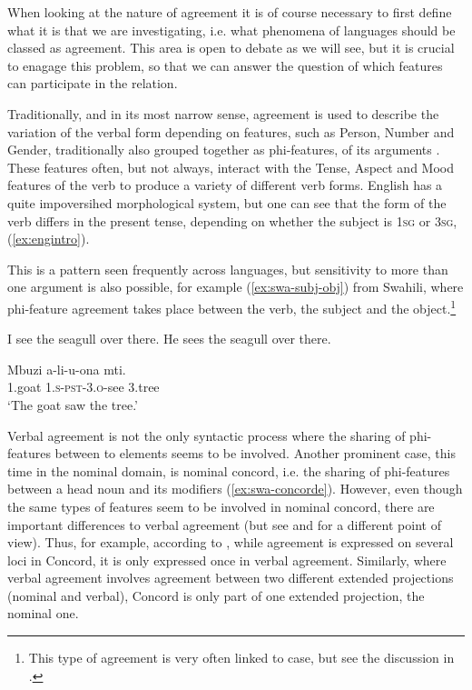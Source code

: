 \documentclass[output=paper
,modfonts
,nonflat]{langsci/langscibook}
\begin{document}
When looking at the nature of agreement it is of course necessary to first define what it is that we are investigating, i.e. what phenomena of languages should be classed as agreement. This area is open to debate as we will see, but it is crucial to enagage this problem, so that we can answer the question of which features can participate in the {\agr} relation.

Traditionally, and in its most narrow sense, agreement is used to describe the variation of the verbal form depending on features, such as Person, Number and Gender, traditionally also grouped together as phi-fea\-tures, of its arguments \citep{preminger2015}.
These features often, but not always, interact with the Tense, Aspect and Mood features of the verb to produce a variety of different verb forms.
English has a quite impoversihed morphological system, but one can see that the form of the verb differs in the present tense, depending on whether the subject is \textsc{1sg} or \textsc{3sg}, (\ref{ex:engintro}).

This is a pattern seen frequently across languages, but sensitivity to more than one argument is also possible, for example (\ref{ex:swa-subj-obj}) from Swahili, where phi-feature agreement takes place between the verb, the subject and the object.\footnote{This type of agreement is very often linked to case, but see the discussion in .}

\begin{exe}
	\ex \label{ex:engintro}
	\begin{xlist}
		\ex I see the seagull over there.
		\ex He sees the seagull over there.
	\end{xlist}
\end{exe}

\begin{exe}
	\ex \label{ex:swa-subj-obj}
	\gll Mbuzi a-li-u-ona mti.\\
	1.goat \textsc{1.s-pst-3.o}-see 3.tree\\
	\glt `The goat saw the tree.'

\end{exe}
Verbal agreement is not the only syntactic process where the sharing of phi-fea\-tures between to elements seems to be involved.
Another prominent case, this time in the nominal domain, is nominal concord, i.e. the sharing of phi-fea\-tures between a head noun and its modifiers (\ref{ex:swa-concorde}).
However, even though the same types of features seem to be involved in nominal concord, there are important differences to verbal agreement (but see \citealt{Carstens2001} and \citealt{Baker2008a} for a different point of view). Thus, for example, according to \citet[][7]{Norris2014}, while agreement is expressed on several loci in Concord, it is only expressed once in verbal agreement. Similarly, where verbal agreement involves agreement between two different extended projections (nominal and verbal), Concord is only part of one extended projection, the nominal one.
\end{document}
